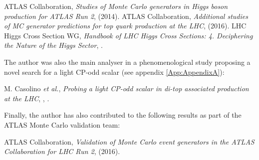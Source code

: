 \bi
\ib ATLAS Collaboration, \emph{Studies of Monte Carlo generators in Higgs boson production for ATLAS Run 2},  (2014).
\ib ATLAS Collaboration, \emph{Additional studies of MC generator predictions for top quark production at the LHC},  (2016).
\ib LHC Higgs Cross Section WG, \emph{Handbook of LHC Higgs Cross Sections: 4. Deciphering the Nature of the Higgs Sector}, .
\ei

\noindent The author was also the main analyser in a phenomenological study proposing a novel search for a light CP-odd scalar (see appendix \ref{App:AppendixA}): 

\bi
\ib M. Casolino \emph{et al.}, \emph{Probing a light CP-odd scalar in di-top associated production at the LHC}, , .
\ei

\noindent Finally, the author has also contributed to the following results as part of the ATLAS Monte Carlo validation team:

\bi
\ib ATLAS Collaboration, \emph{Validation of Monte Carlo event generators in the ATLAS Collaboration for LHC Run 2},  (2016).
\ei